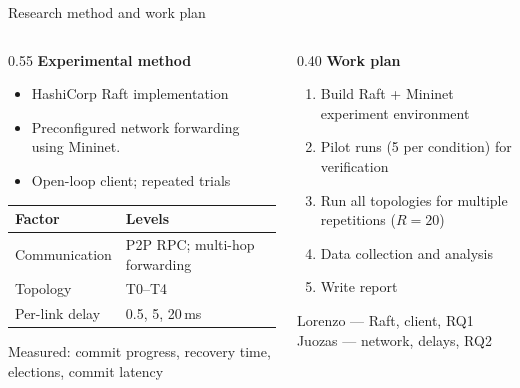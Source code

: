 \documentclass[aspectratio=169,11pt]{beamer}
\begin{document}
\begin{frame}{Research method and work plan}
  \begin{columns}[T,onlytextwidth]
    \begin{column}{0.55\textwidth}
      \textbf{Experimental method}\\[0.35em]
      {\footnotesize
      \begin{itemize}\itemsep0.28em
        \item HashiCorp Raft implementation
        \item Preconfigured network forwarding using Mininet.
        \item Open-loop client; repeated trials
      \end{itemize}}

      \vspace{0.55em}
      {\footnotesize
      \begin{tabular}{@{}p{2.6cm}p{4.4cm}@{}}
        \toprule
        Factor & Levels \\
        \midrule
        Communication & P2P RPC; multi-hop forwarding \\
        Topology & T0--T4 \\
        Per-link delay & 0.5, 5, 20\,ms \\
        \bottomrule
      \end{tabular}}

      \vspace{0.45em}
      {\scriptsize\color{quiet}Measured: commit progress, recovery time, elections, commit latency}
    \end{column}
    \begin{column}{0.40\textwidth}
      \textbf{Work plan}\\[0.35em]
      {\footnotesize
      \begin{enumerate}\itemsep0.38em
        \item Build Raft + Mininet experiment environment
        \item Pilot runs (5 per condition) for verification
        \item Run all topologies for multiple repetitions ($R=20$)
        \item Data collection and analysis
        \item Write report
      \end{enumerate}}

      \vspace{0.7em}
      {\scriptsize\color{quiet}
      Lorenzo --- Raft, client, RQ1\\[0.15em]
      Juozas --- network, delays, RQ2}
    \end{column}
  \end{columns}
\end{frame}
\end{document}
